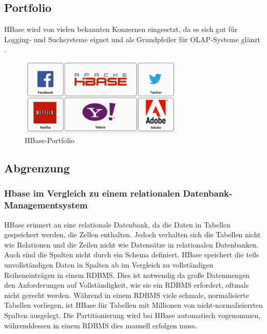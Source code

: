 

\subsection{Portfolio}
HBase wird von vielen bekannten Konzernen eingesetzt, da es sich gut für Logging- und Suchsysteme  eignet und als Grundpfeiler für \ac{OLAP}-Systeme glänzt \cite{Redt01}.

\begin{figure}[htbp] 
  \centering
     \includegraphics[width=0.7\textwidth]{images/portfolio.png}
  \caption{HBase-Portfolio}
  \label{fig:Portfolio}
\end{figure}

\subsection{Abgrenzung}



\subsubsection{Hbase im Vergleich zu einem relationalen Datenbank-Managementsystem}
HBase erinnert an eine relationale Datenbank, da die Daten in Tabellen gespeichert werden, die Zellen enthalten. Jedoch verhalten sich die Tabellen nicht wie Relationen und die Zeilen nicht wie Datensätze in relationalen Datenbanken. Auch sind die Spalten nicht durch ein Schema definiert.
HBase speichert die teils unvollständigen Daten in Spalten ab im Vergleich zu vollständigen Reiheneinträgen in einem RDBMS. Dies ist notwendig da große Datenmengen den Anforderungen auf Vollständigkeit, wie sie ein RDBMS erfordert, oftmals nicht gerecht werden.  
Während in einem RDBMS viele schmale, normalisierte Tabellen vorliegen, ist HBase für Tabellen mit Millionen von nicht-normalisierrten Spalten ausgelegt. Die Partitionierung wird bei HBase automatisch vogenommen, währenddessen in einem RDBMS dies manuell erfolgen muss.


